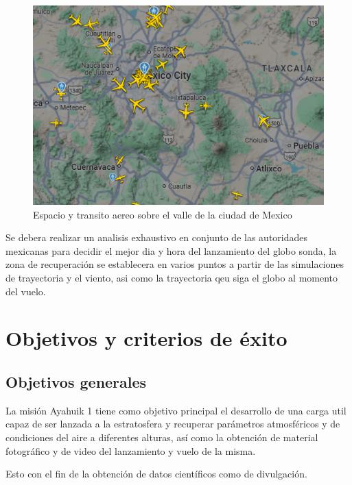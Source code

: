 \documentclass[letterpaper,12pt]{article} %
\begin{document}
    \begin{figure}[H]
      \centerline{\includegraphics[width=.8\textwidth]{Espacioaereo.png}}
      \caption{Espacio y transito aereo sobre el valle de la ciudad de Mexico}
      \label{fig:Espacio}
    \end{figure}

    Se debera realizar un analisis exhaustivo en conjunto de las autoridades mexicanas 
    para decidir el mejor dia y hora del lanzamiento del globo sonda, la zona de recuperación se 
    establecera en varios puntos a partir de las simulaciones de trayectoria y el viento, asi como 
    la trayectoria qeu siga el globo al momento del vuelo.


\newpage
\section{Objetivos y criterios de éxito}

    \subsection{Objetivos generales}
    La misión Ayahuik 1 tiene como objetivo principal el desarrollo de una carga util capaz de ser lanzada a la estratosfera
    y recuperar parámetros atmosféricos y de condiciones del aire a diferentes alturas,
    así como la obtención de material fotográfico y de video del lanzamiento y vuelo de la misma.


    Esto con el fin de la obtención de datos científicos como de divulgación.
\end{document}
